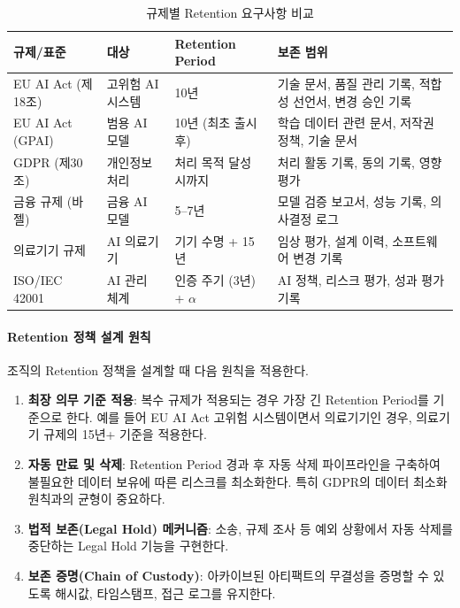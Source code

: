 \begin{table}[htbp]
\centering
\caption{규제별 Retention 요구사항 비교}
\label{tab:retention_by_regulation}
\begin{tabularx}{\textwidth}{p{3cm}p{2.5cm}p{2.5cm}X}
\toprule
\textbf{규제/표준} & \textbf{대상} & \textbf{Retention Period} & \textbf{보존 범위} \\
\midrule
EU AI Act (제18조) &
고위험 AI 시스템 &
10년 &
기술 문서, 품질 관리 기록, 적합성 선언서, 변경 승인 기록 \\
\midrule
EU AI Act (GPAI) &
범용 AI 모델 &
10년 (최초 출시 후) &
학습 데이터 관련 문서, 저작권 정책, 기술 문서 \\
\midrule
GDPR (제30조) &
개인정보 처리 &
처리 목적 달성 시까지 &
처리 활동 기록, 동의 기록, 영향 평가 \\
\midrule
금융 규제 (바젤) &
금융 AI 모델 &
5--7년 &
모델 검증 보고서, 성능 기록, 의사결정 로그 \\
\midrule
의료기기 규제 &
AI 의료기기 &
기기 수명 + 15년 &
임상 평가, 설계 이력, 소프트웨어 변경 기록 \\
\midrule
ISO/IEC 42001 &
AI 관리 체계 &
인증 주기 (3년) + $\alpha$ &
AI 정책, 리스크 평가, 성과 평가 기록 \\
\bottomrule
\end{tabularx}
\end{table}

\paragraph{Retention 정책 설계 원칙}
조직의 Retention 정책을 설계할 때 다음 원칙을 적용한다.

\begin{enumerate}
 \item \textbf{최장 의무 기준 적용}: 복수 규제가 적용되는 경우 가장 긴 Retention Period를 기준으로 한다. 예를 들어 EU AI Act 고위험 시스템이면서 의료기기인 경우, 의료기기 규제의 15년+ 기준을 적용한다.
 \item \textbf{자동 만료 및 삭제}: Retention Period 경과 후 자동 삭제 파이프라인을 구축하여 불필요한 데이터 보유에 따른 리스크를 최소화한다. 특히 GDPR의 데이터 최소화 원칙과의 균형이 중요하다.
 \item \textbf{법적 보존(Legal Hold) 메커니즘}: 소송, 규제 조사 등 예외 상황에서 자동 삭제를 중단하는 Legal Hold 기능을 구현한다.
 \item \textbf{보존 증명(Chain of Custody)}: 아카이브된 아티팩트의 무결성을 증명할 수 있도록 해시값, 타임스탬프, 접근 로그를 유지한다.
\end{enumerate}

